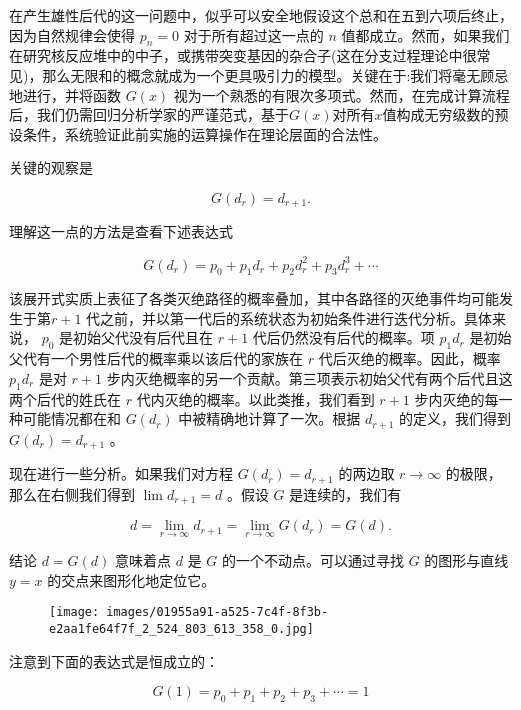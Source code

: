 在产生雄性后代的这一问题中，似乎可以安全地假设这个总和在五到六项后终止，因为自然规律会使得 \({p}_{n} = 0\) 对于所有超过这一点的 \(n\) 值都成立。然而，如果我们在研究核反应堆中的中子，或携带突变基因的杂合子(这在分支过程理论中很常见)，那么无限和的概念就成为一个更具吸引力的模型。关键在于:我们将毫无顾忌地进行，并将函数 \(G\left( x\right)\) 视为一个熟悉的有限次多项式。然而，在完成计算流程后，我们仍需回归分析学家的严谨范式，基于\(G(x)\)对所有\(x\)值构成无穷级数的预设条件，系统验证此前实施的运算操作在理论层面的合法性。

关键的观察是

\[
G\left( {d}_{r}\right)  = {d}_{r + 1}.
\]

理解这一点的方法是查看下述表达式

\[
G\left( {d}_{r}\right)  = {p}_{0} + {p}_{1}{d}_{r} + {p}_{2}{d}_{r}^{2} + {p}_{3}{d}_{r}^{3} + \cdots
\]

该展开式实质上表征了各类灭绝路径的概率叠加，其中各路径的灭绝事件均可能发生于第\( r+1\) 代之前，并以第一代后的系统状态为初始条件进行迭代分析。具体来说， \({p}_{0}\) 是初始父代没有后代且在 \(r + 1\) 代后仍然没有后代的概率。项 \({p}_{1}{d}_{r}\) 是初始父代有一个男性后代的概率乘以该后代的家族在 \(r\) 代后灭绝的概率。因此，概率 \({p}_{1}{d}_{r}\) 是对 \(r + 1\) 步内灭绝概率的另一个贡献。第三项表示初始父代有两个后代且这两个后代的姓氏在 \(r\) 代内灭绝的概率。以此类推，我们看到 \(r + 1\) 步内灭绝的每一种可能情况都在和 \(G\left( {d}_{r}\right)\) 中被精确地计算了一次。根据 \({d}_{r + 1}\) 的定义，我们得到 \(G\left( {d}_{r}\right)  = {d}_{r + 1}\) 。

现在进行一些分析。如果我们对方程 \(G\left( {d}_{r}\right)  = {d}_{r + 1}\) 的两边取 \(r \rightarrow  \infty\) 的极限，那么在右侧我们得到 \(\lim {d}_{r + 1} = d\) 。假设 \(G\) 是连续的，我们有

\[
d = \mathop{\lim }\limits_{{r \rightarrow  \infty }}{d}_{r + 1} = \mathop{\lim }\limits_{{r \rightarrow  \infty }}G\left( {d}_{r}\right)  = G\left( d\right) .
\]

结论 \(d = G\left( d\right)\) 意味着点 \(d\) 是 \(G\) 的一个不动点。可以通过寻找 \(G\) 的图形与直线 \(y = x\) 的交点来图形化地定位它。


\begin{figure}[h]
  \centering
  \texttt{[image: images/01955a91-a525-7c4f-8f3b-e2aa1fe64f7f\_2\_524\_803\_613\_358\_0.jpg]}
\end{figure}

注意到下面的表达式是恒成立的：

\[
G\left( 1\right)  = {p}_{0} + {p}_{1} + {p}_{2} + {p}_{3} + \cdots  = 1
\]

